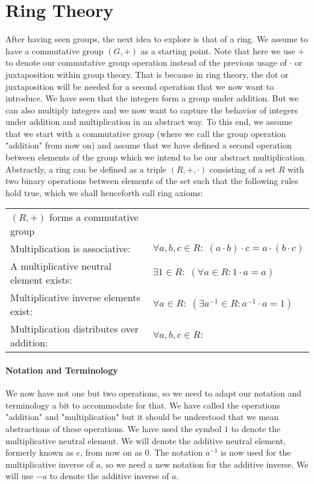 \section{Ring Theory}
After having seen groups, the next idea to explore is that of a ring. We assume to have a commutative group $(G, +)$ as a starting point. Note that here we use $+$ to denote our commutative group operation instead of the previous usage of $\cdot$ or juxtaposition within group theory. That is because in ring theory, the dot or juxtaposition will be needed for a second operation that we now want to introduce. We have seen that the integers form a group under addition. But we can also multiply integers and we now want to capture the behavior of integers under addition and multiplication in an abstract way. To this end, we assume that we start with a commutative group (where we call the group operation "addition" from now on) and assume that we have defined a second operation between elements of the group which we intend to be our abstract multiplication. Abstractly, a ring can be defined as a triple $(R,+,\cdot)$ consisting of a set $R$ with two binary operations between elements of the set such that the following rules hold true, which we shall henceforth call ring axioms:

\medskip
\begin{tabular}{l l}
$(R,+)$ forms a commutative group \\	
Multiplication is associative: 
& $\forall a,b,c \in R: \;  (a \cdot b) \cdot c = a \cdot (b \cdot c)$   \\
A multiplicative neutral element exists: 
& $\exists 1 \in R: \; (\forall a \in R: 1 \cdot a = a)$ \\
Multiplicative inverse elements exist: 
& $\forall a \in R: \; (\exists a^{-1} \in R: a^{-1} \cdot a = 1 )$ \\
Multiplication distributes over addition: 
& $\forall a,b,c \in R: \;$
\end{tabular}
\medskip

\paragraph{Notation and Terminology}
We now have not one but two operations, so we need to adapt our notation and terminology a bit to accommodate for that. We have called the operations "addition" and "multiplication" but it should be understood that we mean abstractions of these operations. We have used the symbol $1$ to denote the multiplicative neutral element. We will denote the additive neutral element, formerly known as $e$, from now on as $0$. The notation $a^{-1}$ is now used for the multiplicative inverse of $a$, so we need a new notation for the additive inverse. We will use $-a$ to denote the additive inverse of $a$. 

